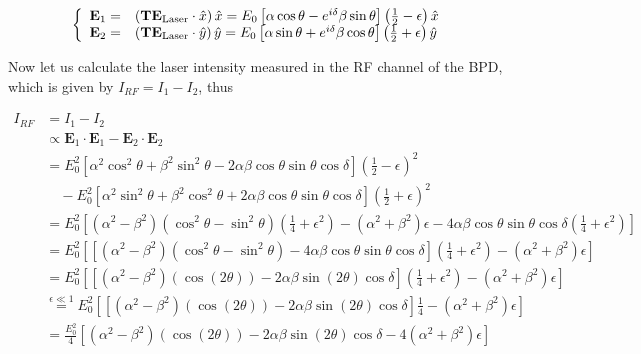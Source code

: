 \documentclass{article}
\begin{document}
 \begin{align}
    \left\{
     \begin{array}{c l}
         \mathbf{E}_1 =& \left(\mathbf{T}\mathbf{E}_{\text{Laser}}\cdot \hat{x}\right)\hat{x}  = E_0 \left[\alpha\cos{\theta -e^{i\delta}\beta\sin{\theta}}\right]\left(\frac{1}{2}-\epsilon\right)\hat{x}\\
         \mathbf{E}_2 =& \left(\mathbf{T}\mathbf{E}_{\text{Laser}}\cdot \hat{y}\right)\hat{y}  = E_0 \left[\alpha\sin{\theta +e^{i\delta}\beta\cos{\theta}}\right]\left(\frac{1}{2}+\epsilon\right)\hat{y}
     \end{array}
    \right.
 \end{align}
 
 Now let us calculate the laser intensity measured in the RF channel of the BPD, which is given by $I_{RF}=I_{1}-I_{2}$, thus
 
 \begin{align}
     I_{RF} &= I_1 - I_2\\
            &\propto \mathbf{E}_1\cdot \mathbf{E}_1 - \mathbf{E}_2\cdot \mathbf{E}_2\\
            &= E_0^2 \left[\alpha^2\cos^2\theta+\beta^2\sin^2\theta - 2\alpha\beta\cos{\theta}\sin{\theta}\cos{\delta}\right]\left(\frac{1}{2}-\epsilon\right)^2\\
            &\quad- E_0^2\left[\alpha^2\sin^2\theta+\beta^2\cos^2\theta + 2\alpha\beta\cos{\theta}\sin{\theta}\cos{\delta}\right]\left(\frac{1}{2}+\epsilon\right)^2\\
            &= E_0^2 \left[\left(\alpha^2-\beta^2\right)\left(\cos^2\theta - \sin^2\theta\right)\left(\frac{1}{4}+\epsilon^2\right) - \left(\alpha^2+\beta^2\right)\epsilon - 4\alpha\beta\cos{\theta}\sin{\theta}\cos{\delta}\left(\frac{1}{4} + \epsilon^2\right)\right]\\
            &= E_0^2 \left[\left[\left(\alpha^2-\beta^2\right)\left(\cos^2\theta - \sin^2\theta\right) - 4\alpha\beta\cos{\theta}\sin{\theta}\cos{\delta}  \right]\left(\frac{1}{4}+\epsilon^2\right) - \left(\alpha^2+\beta^2\right)\epsilon \right]\\
            &= E_0^2 \left[\left[\left(\alpha^2-\beta^2\right)\left(\cos{\left(2\theta\right)}\right) - 2\alpha\beta\sin{\left(2\theta\right)}\cos{\delta}  \right]\left(\frac{1}{4}+\epsilon^2\right) - \left(\alpha^2+\beta^2\right)\epsilon \right]\\
            &\overset{\epsilon\ll1}{=} E_0^2 \left[\left[\left(\alpha^2-\beta^2\right)\left(\cos{\left(2\theta\right)}\right) - 2\alpha\beta\sin{\left(2\theta\right)}\cos{\delta}  \right]\frac{1}{4} - \left(\alpha^2+\beta^2\right)\epsilon \right]\\
            &= \boxed{\frac{E_0^2}{4} \left[\left(\alpha^2-\beta^2\right)\left(\cos{\left(2\theta\right)}\right) - 2\alpha\beta\sin{\left(2\theta\right)}\cos{\delta}  - 4\left(\alpha^2+\beta^2\right)\epsilon \right]}\label{eq:rf_signal}
 \end{align}
 
\end{document}
